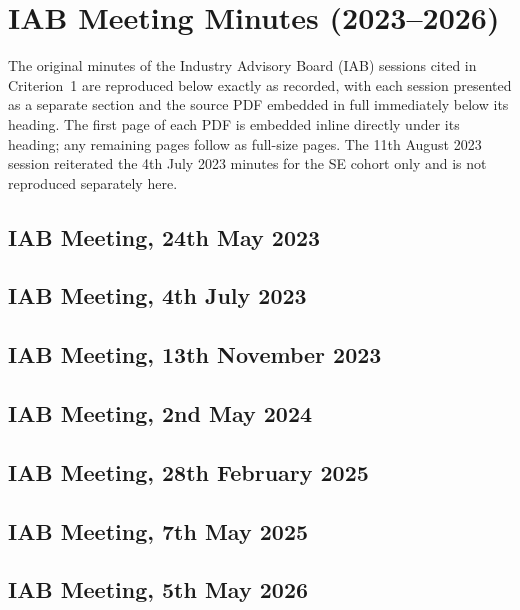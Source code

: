 \chapter{IAB Meeting Minutes (2023--2026)}\label{app:iab_minutes}

The original minutes of the Industry Advisory Board (IAB) sessions cited in Criterion~1 are reproduced below exactly as recorded, with each session presented as a separate section and the source PDF embedded in full immediately below its heading. The first page of each PDF is embedded inline directly under its heading; any remaining pages follow as full-size pages. The 11th August 2023 session reiterated the 4th July 2023 minutes for the SE cohort only and is not reproduced separately here.

\section{IAB Meeting, 24th May 2023}

\section{IAB Meeting, 4th July 2023}

\section{IAB Meeting, 13th November 2023}

\section{IAB Meeting, 2nd May 2024}

\section{IAB Meeting, 28th February 2025}

\section{IAB Meeting, 7th May 2025}

\section{IAB Meeting, 5th May 2026}
